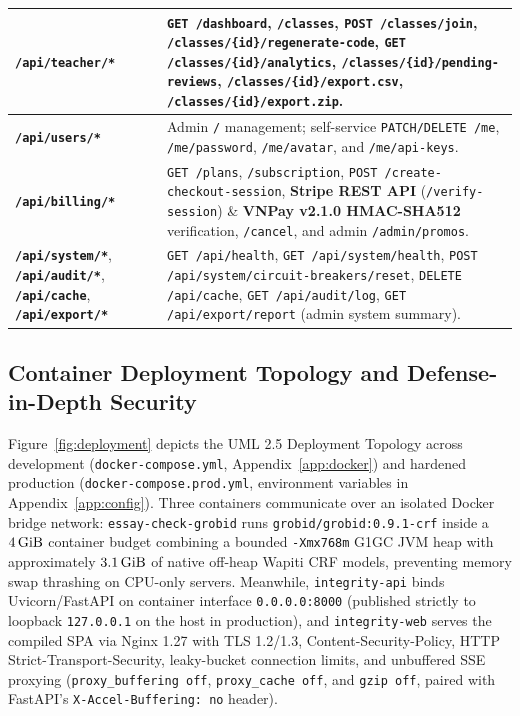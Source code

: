 {\begin{longtable}{|L{0.31}|L{0.69}|}
\hline
\textbf{\texttt{/api/teacher/*}} & \texttt{GET /dashboard}, \texttt{/classes}, \texttt{POST /classes/join}, \texttt{/classes/\{id\}/regenerate-code}, \texttt{GET /classes/\{id\}/analytics}, \texttt{/classes/\{id\}/pending-reviews}, \texttt{/classes/\{id\}/export.csv}, \texttt{/classes/\{id\}/export.zip}. \\
\hline
\textbf{\texttt{/api/users/*}} & Admin \texttt{/} management; self-service \texttt{PATCH/DELETE /me}, \texttt{/me/password}, \texttt{/me/avatar}, and \texttt{/me/api-keys}. \\
\hline
\textbf{\texttt{/api/billing/*}} & \texttt{GET /plans}, \texttt{/subscription}, \texttt{POST /create-checkout-session}, \textbf{Stripe REST API} (\texttt{/verify-session}) \& \textbf{VNPay v2.1.0 HMAC-SHA512} verification, \texttt{/cancel}, and admin \texttt{/admin/promos}. \\
\hline
\textbf{\texttt{/api/system/*}}, \textbf{\texttt{/api/audit/*}}, \textbf{\texttt{/api/cache}}, \textbf{\texttt{/api/export/*}} & \texttt{GET /api/health}, \texttt{GET /api/system/health}, \texttt{POST /api/system/circuit-breakers/reset}, \texttt{DELETE /api/cache}, \texttt{GET /api/audit/log}, \texttt{GET /api/export/report} (admin system summary). \\
\hline
\end{longtable}
}

\subsection{Container Deployment Topology and Defense-in-Depth Security}

Figure~\ref{fig:deployment} depicts the UML 2.5 Deployment Topology across development (\texttt{docker-compose.yml}, Appendix~\ref{app:docker}) and hardened production (\texttt{docker-compose.prod.yml}, environment variables in Appendix~\ref{app:config}). Three containers communicate over an isolated Docker bridge network: \texttt{essay-\allowbreak{}check-\allowbreak{}grobid} runs \texttt{grobid/grobid:0.9.1-crf} inside a $4\text{\,GiB}$ container budget combining a bounded \texttt{-Xmx768m} G1GC JVM heap with approximately $3.1\text{\,GiB}$ of native off-heap Wapiti CRF models, preventing memory swap thrashing on CPU-only servers. Meanwhile, \texttt{integrity-api} binds Uvicorn/FastAPI on container interface \texttt{0.0.0.0:8000} (published strictly to loopback \texttt{127.0.0.1} on the host in production), and \texttt{integrity-web} serves the compiled SPA via Nginx 1.27 with TLS 1.2/1.3, Content-Security-Policy, HTTP Strict-Transport-Security, leaky-bucket connection limits, and unbuffered SSE proxying (\texttt{proxy\_buffering off}, \texttt{proxy\_cache off}, and \texttt{gzip off}, paired with FastAPI's \texttt{X-Accel-Buffering: no} header).

